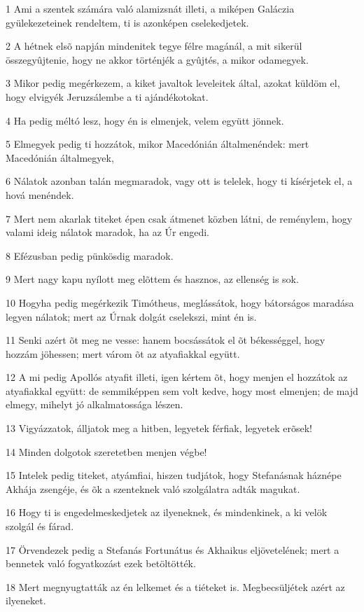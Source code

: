 \par 1 Ami a szentek számára való alamizsnát illeti, a miképen Galáczia gyülekezeteinek rendeltem, ti  is azonképen cselekedjetek.
\par 2 A hétnek elsõ napján mindenitek tegye félre magánál, a mit sikerül összegyûjtenie, hogy ne akkor történjék a gyûjtés, a mikor odamegyek.
\par 3 Mikor pedig megérkezem, a kiket javaltok leveleitek által, azokat küldöm el, hogy elvigyék Jeruzsálembe a ti ajándékotokat.
\par 4 Ha pedig méltó lesz, hogy én is elmenjek, velem együtt jönnek.
\par 5 Elmegyek pedig ti hozzátok, mikor Macedónián általmenéndek: mert Macedónián általmegyek,
\par 6 Nálatok azonban talán megmaradok, vagy ott is telelek, hogy ti kísérjetek el, a hová menéndek.
\par 7 Mert nem akarlak titeket épen csak átmenet közben látni, de reménylem, hogy valami ideig nálatok maradok, ha az Úr engedi.
\par 8 Efézusban pedig pünkösdig maradok.
\par 9 Mert nagy kapu nyílott meg elõttem és hasznos, az ellenség is sok.
\par 10 Hogyha pedig megérkezik Timótheus, meglássátok, hogy bátorságos maradása legyen nálatok; mert az Úrnak dolgát cselekszi, mint én is.
\par 11 Senki azért õt meg ne vesse: hanem bocsássátok el õt békességgel, hogy hozzám jöhessen; mert várom õt az atyafiakkal együtt.
\par 12 A mi pedig Apollós atyafit illeti, igen kértem õt, hogy menjen el hozzátok az atyafiakkal együtt: de semmiképpen sem volt kedve, hogy most elmenjen; de majd elmegy, mihelyt jó alkalmatossága lészen.
\par 13 Vigyázzatok, álljatok meg a hitben, legyetek férfiak, legyetek erõsek!
\par 14 Minden dolgotok szeretetben menjen végbe!
\par 15 Intelek pedig titeket, atyámfiai, hiszen tudjátok, hogy Stefanásnak háznépe Akhája zsengéje,  és õk a szenteknek való szolgálatra adták magukat.
\par 16 Hogy ti is engedelmeskedjetek az ilyeneknek, és mindenkinek, a ki velök szolgál és fárad.
\par 17 Örvendezek pedig a Stefanás Fortunátus és Akhaikus eljövetelének; mert a bennetek való fogyatkozást ezek betöltötték.
\par 18 Mert megnyugtatták az én lelkemet és a tiéteket is. Megbecsüljétek azért az ilyeneket.
